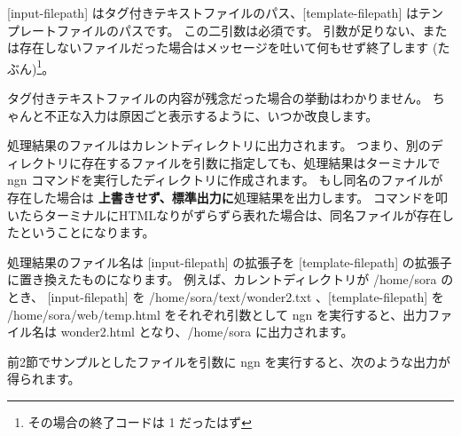 \documentclass[a4j]{jsarticle}
\begin{document}
[input-filepath] はタグ付きテキストファイルのパス、[template-filepath] はテンプレートファイルのパスです。
この二引数は必須です。
引数が足りない、または存在しないファイルだった場合はメッセージを吐いて何もせず終了します (たぶん)\footnote{その場合の終了コードは 1 だったはず}。

タグ付きテキストファイルの内容が残念だった場合の挙動はわかりません。
ちゃんと不正な入力は原因ごと表示するように、いつか改良します。

処理結果のファイルはカレントディレクトリに出力されます。
つまり、別のディレクトリに存在するファイルを引数に指定しても、処理結果はターミナルで ngn コマンドを実行したディレクトリに作成されます。
もし同名のファイルが存在した場合は \textbf{上書きせず、標準出力に}処理結果を出力します。
コマンドを叩いたらターミナルにHTMLなりがずらずら表れた場合は、同名ファイルが存在したということになります。

処理結果のファイル名は [input-filepath] の拡張子を [template-filepath] の拡張子に置き換えたものになります。
例えば、カレントディレクトリが /home/sora のとき、 [input-filepath] を /home/sora/text/wonder2.txt 、[template-filepath] を /home/sora/web/temp.html をそれぞれ引数として ngn を実行すると、出力ファイル名は wonder2.html となり、/home/sora に出力されます。

前2節でサンプルとしたファイルを引数に ngn を実行すると、次のような出力が得られます。


\end{document}
